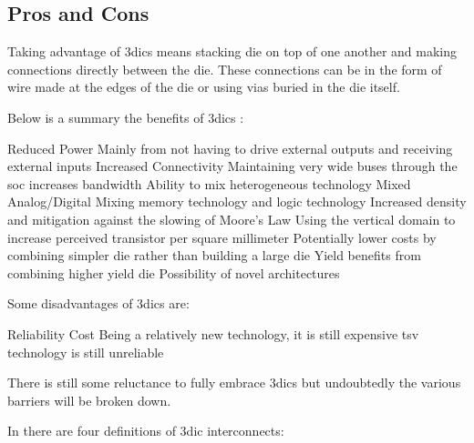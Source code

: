 \subsection{Pros and Cons}
\label{sec:3dic benefits}

Taking advantage of \acp{3dic} means stacking die on top of one another and making connections directly between the die. These connections can be in the form of wire made at the edges of the die or using vias buried in the die itself.


Below is a summary the benefits of \acp{3dic} :
\begin{outline}
  \1 Reduced Power
    \2 Mainly from not having to drive external outputs and receiving external inputs
  \1 Increased Connectivity
    \2 Maintaining very wide buses through the \ac{soc} increases bandwidth
  \1 Ability to mix heterogeneous technology
    \2 Mixed Analog/Digital
    \2 Mixing memory technology and logic technology
  \1 Increased density and mitigation against the slowing of Moore's Law
    \2 Using the vertical domain to increase perceived transistor per square millimeter
  \1 Potentially lower costs by combining simpler die rather than building a large die
    \2 Yield benefits from combining higher yield die
  \1 Possibility of novel architectures \cite{Kim2016}
\end{outline}

Some disadvantages of \acp{3dic} are:
\begin{outline}
  \1 Reliability
  \1 Cost
    \2 Being a relatively new technology, it is still expensive 
    \2 \ac{tsv} technology is still unreliable
\end{outline}

There is still some reluctance to fully embrace \acp{3dic} but undoubtedly the various barriers will be broken down.
\iffalse
The ability to mix technology targeted toward \ac{dram} with \acs{cmos} is something of which this work takes advantage.
\fi

In \cite{itrs2015_interconn} there are four definitions of \ac{3dic} interconnects:

